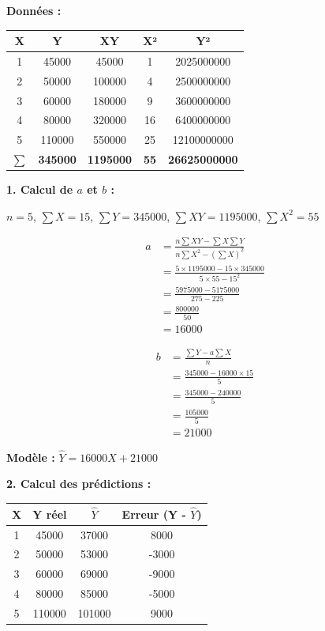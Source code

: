 \documentclass[11pt,a4paper]{article}
\begin{document}
\begin{solutionbox}
\textbf{Données :}
\begin{center}
\begin{tabular}{|c|c|c|c|c|}
\hline
\textbf{X} & \textbf{Y} & \textbf{XY} & \textbf{X²} & \textbf{Y²} \\
\hline
1 & 45000 & 45000 & 1 & 2025000000 \\
2 & 50000 & 100000 & 4 & 2500000000 \\
3 & 60000 & 180000 & 9 & 3600000000 \\
4 & 80000 & 320000 & 16 & 6400000000 \\
5 & 110000 & 550000 & 25 & 12100000000 \\
\hline
\textbf{$\sum$} & \textbf{345000} & \textbf{1195000} & \textbf{55} & \textbf{26625000000} \\
\hline
\end{tabular}
\end{center}

\textbf{1. Calcul de $a$ et $b$ :}

$n = 5$, $\sum X = 15$, $\sum Y = 345000$, $\sum XY = 1195000$, $\sum X^2 = 55$

\begin{align*}
a &= \frac{n\sum XY - \sum X \sum Y}{n\sum X^2 - (\sum X)^2} \\
  &= \frac{5 \times 1195000 - 15 \times 345000}{5 \times 55 - 15^2} \\
  &= \frac{5975000 - 5175000}{275 - 225} \\
  &= \frac{800000}{50} \\
  &= 16000
\end{align*}

\begin{align*}
b &= \frac{\sum Y - a\sum X}{n} \\
  &= \frac{345000 - 16000 \times 15}{5} \\
  &= \frac{345000 - 240000}{5} \\
  &= \frac{105000}{5} \\
  &= 21000
\end{align*}

\textbf{Modèle :} $\hat{Y} = 16000X + 21000$

\textbf{2. Calcul des prédictions :}

\begin{center}
\begin{tabular}{|c|c|c|c|}
\hline
\textbf{X} & \textbf{Y réel} & \textbf{$\hat{Y}$} & \textbf{Erreur (Y - $\hat{Y}$)} \\
\hline
1 & 45000 & 37000 & 8000 \\
2 & 50000 & 53000 & -3000 \\
3 & 60000 & 69000 & -9000 \\
4 & 80000 & 85000 & -5000 \\
5 & 110000 & 101000 & 9000 \\
\hline
\end{tabular}
\end{center}


\end{solutionbox}
\end{document}
